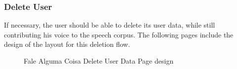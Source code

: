 \subsubsection{Delete User}

If necessary, the user should be able to delete its user data, while still contributing his voice to the speech corpus. The following pages include the design of the layout for this deletion flow.

\begin{figure}[ht]
    \centering
    \caption{Fale Alguma Coisa Delete User Data Page design}

\end{figure}
